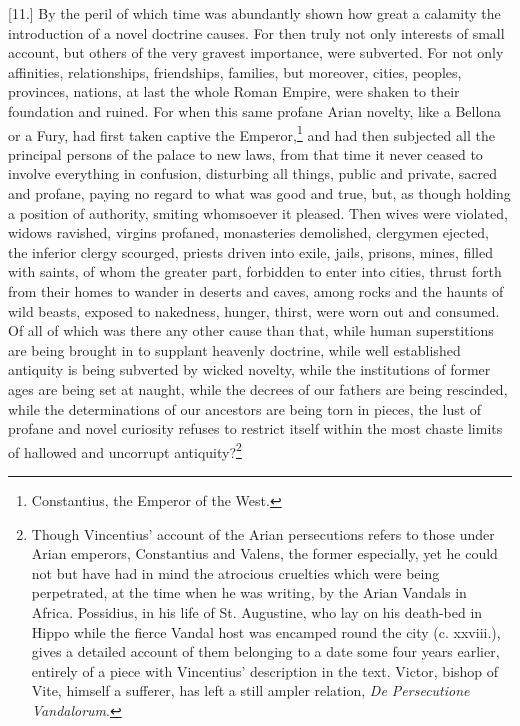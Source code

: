 [11.] By the peril of which time was abundantly shown how great a calamity the introduction of a novel doctrine causes. For then truly not only interests of small account, but others of the very gravest importance, were subverted. For not only affinities, relationships, friendships, families, but moreover, cities, peoples, provinces, nations, at last the whole Roman Empire, were shaken to their foundation and ruined. For when this same profane Arian novelty, like a Bellona or a Fury, had first taken captive the Emperor,\footnote{Constantius, the Emperor of the West.} and had then subjected all the principal persons of the palace to new laws, from that time it never ceased to involve everything in confusion, disturbing all things, public and private, sacred and profane, paying no regard to what was good and true, but, as though holding a position of authority, smiting whomsoever it pleased. Then wives were violated, widows ravished, virgins profaned, monasteries demolished, clergymen ejected, the inferior clergy scourged, priests driven into exile, jails, prisons, mines, filled with saints, of whom the greater part, forbidden to enter into cities, thrust forth from their homes to wander in deserts and caves, among rocks and the haunts of wild beasts, exposed to nakedness, hunger, thirst, were worn out and consumed. Of all of which was there any other cause than that, while human superstitions are being brought in to supplant heavenly doctrine, while well established antiquity is being subverted by wicked novelty, while the institutions of former ages are being set at naught, while the decrees of our fathers are being rescinded, while the determinations of our ancestors are being torn in pieces, the lust of profane and novel curiosity refuses to restrict itself within the most chaste limits of hallowed and uncorrupt antiquity?\footnote{Though Vincentius’ account of the Arian persecutions refers to those under Arian emperors, Constantius and Valens, the former especially, yet he could not but have had in mind the atrocious cruelties which were being perpetrated, at the time when he was writing, by the Arian Vandals in Africa. Possidius, in his life of St. Augustine, who lay on his death-bed in Hippo while the fierce Vandal host was encamped round the city (c. xxviii.), gives a detailed account of them belonging to a date some four years earlier, entirely of a piece with Vincentius’ description in the text. Victor, bishop of Vite, himself a sufferer, has left a still ampler relation, \emph{De Persecutione Vandalorum}.}

